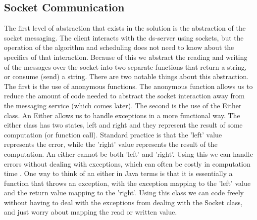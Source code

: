 \documentclass[a4paper]{article} %
\begin{document}
\subsection*{Socket Communication}
The first level of abstraction that exists in the solution is the abstraction of the socket messaging. 
The client interacts with the ds-server using sockets, but the operation of the algorithm and scheduling does not need to know about the specifics of that interaction.
\newline
Because of this we abstract the reading and writing of the messages over the socket into two separate functions that return a string, or consume (send) a string.
There are two notable things about this abstraction. The first is the use of anonymous functions.
The anonymous function allows us to reduce the amount of code needed to abstract the socket interaction away from the messaging service (which comes later). 
The second is the use of the Either class. An Either allows us to handle exceptions in a more functional way\cite{bly_2018}.
The either class has two states, left and right and they represent the result of some computation (or function call). 
Standard practice is that the 'left' value represents the error, while the 'right' value represents the result of the computation.
An either cannot be both 'left' and 'right'. Using this we can handle errors without dealing with exceptions, which can often be costly in computation time \cite{maurer_2013}. 
One way to think of an either in Java terms is that it is essentially a function that throws an exception, with the exception mapping to the 'left' value and the return value mapping to the 'right'.
Using this class we can code freely without having to deal with the exceptions from dealing with the Socket class, and just worry about mapping the read or written value.
\end{document}
